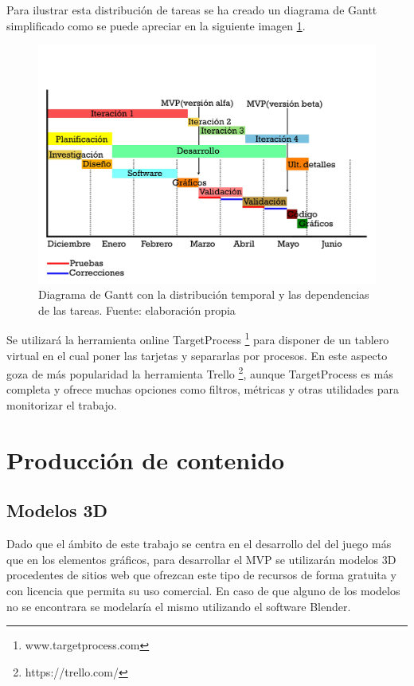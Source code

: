 Para ilustrar esta distribución de tareas se ha creado un diagrama de Gantt simplificado como se puede apreciar en la siguiente imagen \ref{gantt01}.

\begin{figure}
	\begin{center}
		\includegraphics[scale=0.6]{imagenes/GanttDiagram.jpg}
		\caption{Diagrama de Gantt con la distribución temporal y las dependencias de las tareas. Fuente: elaboración propia}
		\label{gantt01}
	\end{center}
\end{figure}

Se utilizará la herramienta online TargetProcess \footnote{www.targetprocess.com} para disponer de un tablero virtual  en el cual poner las tarjetas y separarlas por procesos. En este aspecto goza de más popularidad la herramienta Trello \footnote{https://trello.com/}, aunque TargetProcess es más completa y ofrece muchas opciones como filtros, métricas y otras utilidades para monitorizar el trabajo.

\section{Producción de contenido}
\subsection{Modelos 3D}
Dado que el ámbito de este trabajo se centra en el desarrollo del  del juego más que en los elementos gráficos, para desarrollar el MVP se utilizarán modelos 3D procedentes de sitios web que ofrezcan este tipo de recursos de forma gratuita y con licencia que permita su uso comercial. En caso de que alguno de los modelos no se encontrara se modelaría el mismo utilizando el software Blender. 

